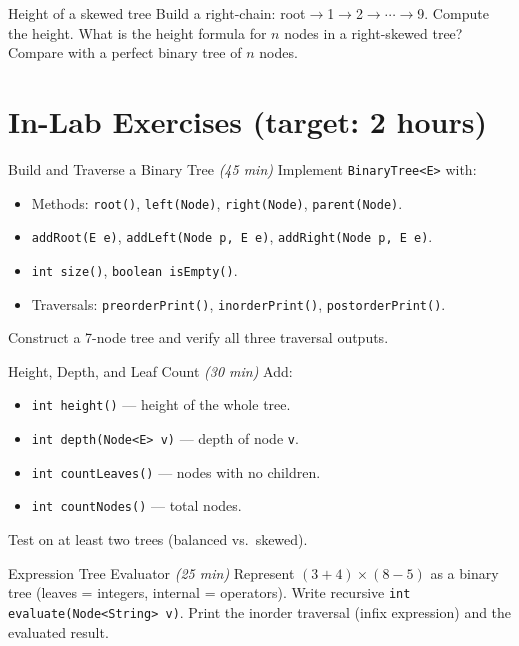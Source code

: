 \documentclass[11pt]{article}
\begin{document}
\begin{tryit}{Height of a skewed tree}
Build a right-chain: root$\to$1$\to$2$\to\cdots\to$9. Compute the height.
What is the height formula for $n$ nodes in a right-skewed tree?
Compare with a perfect binary tree of $n$ nodes.
\end{tryit}

\section*{In-Lab Exercises (target: 2 hours)}

\begin{labexercise}{Build and Traverse a Binary Tree \hfill {\small \itshape (45 min)}}
Implement \texttt{BinaryTree<E>} with:
\begin{itemize}[leftmargin=*,nosep]
  \item Methods: \texttt{root()}, \texttt{left(Node)}, \texttt{right(Node)}, \texttt{parent(Node)}.
  \item \texttt{addRoot(E e)}, \texttt{addLeft(Node p, E e)}, \texttt{addRight(Node p, E e)}.
  \item \texttt{int size()}, \texttt{boolean isEmpty()}.
  \item Traversals: \texttt{preorderPrint()}, \texttt{inorderPrint()}, \texttt{postorderPrint()}.
\end{itemize}
Construct a 7-node tree and verify all three traversal outputs.
\end{labexercise}

\begin{labexercise}{Height, Depth, and Leaf Count \hfill {\small \itshape (30 min)}}
Add:
\begin{itemize}[leftmargin=*,nosep]
  \item \texttt{int height()} --- height of the whole tree.
  \item \texttt{int depth(Node<E> v)} --- depth of node \texttt{v}.
  \item \texttt{int countLeaves()} --- nodes with no children.
  \item \texttt{int countNodes()} --- total nodes.
\end{itemize}
Test on at least two trees (balanced vs.\ skewed).
\end{labexercise}

\begin{labexercise}{Expression Tree Evaluator \hfill {\small \itshape (25 min)}}
Represent $(3 + 4) \times (8 - 5)$ as a binary tree (leaves = integers, internal = operators).
Write recursive \texttt{int evaluate(Node<String> v)}.
Print the inorder traversal (infix expression) and the evaluated result.
\end{labexercise}
\end{document}
